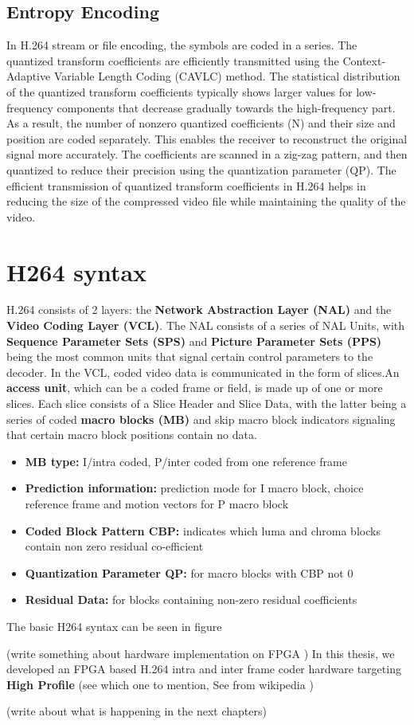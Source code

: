 \subsection{Entropy Encoding}
In H.264 stream or file encoding, the symbols are coded in a series. The quantized transform coefficients are efficiently transmitted using the Context-Adaptive Variable Length Coding (CAVLC) method. The statistical distribution of the quantized transform coefficients typically shows larger values for low-frequency components that decrease gradually towards the high-frequency part. As a result, the number of nonzero quantized coefficients (N) and their size and position are coded separately. This enables the receiver to reconstruct the original signal more accurately. The coefficients are scanned in a zig-zag pattern, and then quantized to reduce their precision using the quantization parameter (QP). The efficient transmission of quantized transform coefficients in H.264 helps in reducing the size of the compressed video file while maintaining the quality of the video.

\section{H264 syntax}
H.264 consists of 2 layers: the \textbf{Network Abstraction Layer (NAL)} and the \textbf{Video Coding Layer (VCL)}. The NAL consists of a series of NAL Units, with \textbf{Sequence Parameter Sets (SPS)} and \textbf{Picture Parameter Sets (PPS)} being the most common units that signal certain control parameters to the decoder. In the VCL, coded video data is communicated in the form of slices.An \textbf{access unit}, which can be a coded frame or field, is made up of one or more slices. Each slice consists of a Slice Header and Slice Data, with the latter being a series of coded \textbf{macro blocks (MB)} and skip macro block indicators signaling that certain macro block positions contain no data.

\begin{itemize}
	\item \textbf{MB type:} I/intra coded, P/inter coded from one reference frame
	\item \textbf{Prediction information:} prediction mode for I macro block, choice reference frame and motion vectors for P macro block
	\item \textbf{Coded Block Pattern CBP:} indicates which luma and chroma blocks contain non zero residual co-efficient
	\item \textbf{Quantization Parameter QP:} for macro blocks with CBP not 0
	\item \textbf{Residual Data:} for blocks containing non-zero residual coefficients
\end{itemize}

The basic H264 syntax can be seen in figure

(write something about hardware implementation on FPGA )
In this thesis, we developed an FPGA based H.264 intra and inter frame coder hardware targeting \textbf{High Profile} (see which one to mention, See from wikipedia )

(write about what is happening in the next chapters)